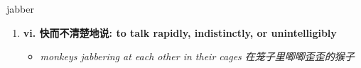 
\begin{frame}
{\huge jabber}
\begin{center}
\begin{enumerate}\Large
  \item \textbf{vi. 快而不清楚地说: to talk rapidly, indistinctly, or unintelligibly}
  \begin{itemize}
    \item \em{\Large{monkeys jabbering at each other in their cages 在笼子里唧唧歪歪的猴子}}
  \end{itemize}
\end{enumerate}
\end{center}
\end{frame}
